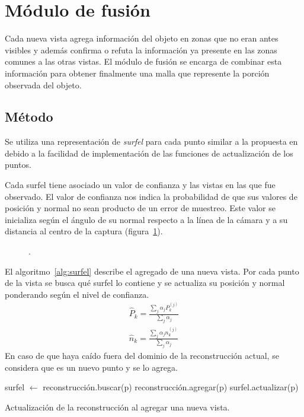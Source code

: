 \section{Módulo de fusión}
	Cada nueva vista agrega información del objeto en zonas que no eran antes visibles
	y además confirma o refuta la información ya presente en las zonas comunes a las otras vistas.
	El módulo de fusión se encarga de combinar esta información para obtener
	finalmente una malla que represente la porción observada del objeto.



	\subsection{Método}
	Se utiliza una representación de \emph{surfel} para cada punto similar a la propuesta en \cite{5457479} %
	debido a la facilidad de implementación de las funciones de actualización de los puntos.

	Cada surfel tiene asociado un valor de confianza y las vistas en las que
	fue observado.  El valor de confianza nos indica la probabilidad de que sus
	valores de posición y normal no sean producto de un error de muestreo.
	Este valor se inicializa según el ángulo de su normal respecto a la línea
	de la cámara y a su distancia al centro de la captura (figura~\ref{fig:confianza_surfel}).

	\begin{figure}
		\caption{\label{fig:confianza_surfel}.}
	\end{figure}


	El algoritmo~\ref{alg:surfel} describe el agregado de una nueva vista.
	Por cada punto de la vista se busca qué surfel lo contiene y se actualiza
	su posición y normal ponderando según el nivel de confianza.
	\begin{eqnarray*}
		\hat{P}_k = \frac{\sum_{j} \alpha_j P^{(j)}_k}{\sum_{j} \alpha_j} \\
		\hat{n}_k = \frac{\sum_{j} \alpha_j n^{(j)}_k}{\sum_{j} \alpha_j}
	\end{eqnarray*}
	En caso de que haya caído fuera del dominio de la reconstrucción actual, se
	considera que es un nuevo punto y se lo agrega.

	\begin{algorithm}
		\begin{algorithmic}[1]
					\State surfel $\gets$ reconstrucción.buscar(p)
						\State reconstrucción.agregar(p)
					\Else
						\State surfel.actualizar(p)
					\EndIf
				\EndFor
			\EndFunction
		\end{algorithmic}
		\caption{\label{alg:surfel}Actualización de la reconstrucción al agregar una nueva vista.}
	\end{algorithm}

